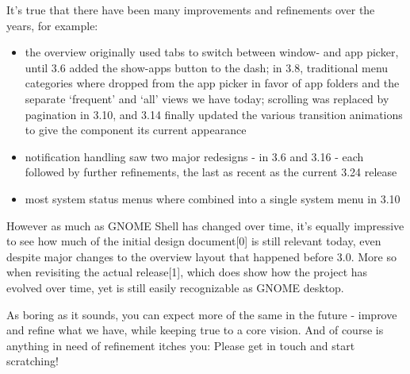 \documentclass[10pt, a5paper]{article}
\begin{document}
\begin{Parallel}[p]{}{}
{\a It's true that there have been many improvements and refinements over the years, for example:
\begin{itemize}
\item the overview originally used tabs to switch between window- and
   app picker, until 3.6 added the show-apps button to the dash; in
   3.8, traditional menu categories where dropped from the app picker
   in favor of app folders and the separate ‘frequent’ and ‘all’ views
   we have today; scrolling was replaced by pagination in 3.10, and 3.14
   finally updated the various transition animations to give the component
   its current appearance

\item notification handling saw two major redesigns - in 3.6 and 3.16 - each
   followed by further refinements, the last as recent as the current 3.24
   release

\item most system status menus where combined into a single system menu in 3.10
\end{itemize}

However as much as GNOME Shell has changed over time, it's equally impressive to see how much of the initial design document[0] is still relevant today, even despite major changes to the overview layout that happened before 3.0. More so when revisiting the actual release[1], which does show how the project has evolved over time, yet is still easily recognizable as GNOME desktop.

As boring as it sounds, you can expect more of the same in the future - improve and refine what we have, while keeping true to a core vision. And of course is anything in need of refinement itches you: Please get in touch and start scratching!
     }
\end{Parallel}
\end{document}
